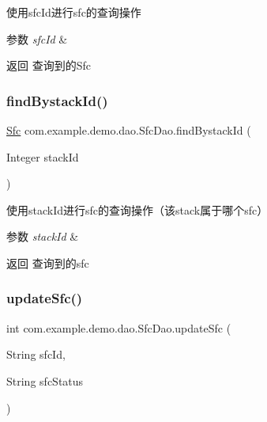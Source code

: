 使用sfc\+Id进行sfc的查询操作 
\begin{DoxyParams}{参数}
{\em sfc\+Id} & \\
\hline
\end{DoxyParams}
\begin{DoxyReturn}{返回}
查询到的\+Sfc 
\end{DoxyReturn}
\mbox{\label{interfacecom_1_1example_1_1demo_1_1dao_1_1_sfc_dao_a8e5fd376717cd55f6b3ae8521dd34b3e}} 
\subsubsection{\texorpdfstring{find\+Bystack\+Id()}{findBystackId()}}
{\footnotesize\ttfamily \mbox{\hyperlink{classcom_1_1example_1_1demo_1_1modular_1_1_sfc}{Sfc}} com.\+example.\+demo.\+dao.\+Sfc\+Dao.\+find\+Bystack\+Id (\begin{DoxyParamCaption}\item[{Integer}]{stack\+Id }\end{DoxyParamCaption})}

使用stack\+Id进行sfc的查询操作（该stack属于哪个sfc） 
\begin{DoxyParams}{参数}
{\em stack\+Id} & \\
\hline
\end{DoxyParams}
\begin{DoxyReturn}{返回}
查询到的sfc 
\end{DoxyReturn}
\mbox{\label{interfacecom_1_1example_1_1demo_1_1dao_1_1_sfc_dao_a6f67e6799aef631a64ed65763adc534f}} 
\subsubsection{\texorpdfstring{update\+Sfc()}{updateSfc()}}
{\footnotesize\ttfamily int com.\+example.\+demo.\+dao.\+Sfc\+Dao.\+update\+Sfc (\begin{DoxyParamCaption}\item[{String}]{sfc\+Id,  }\item[{String}]{sfc\+Status }\end{DoxyParamCaption})}

